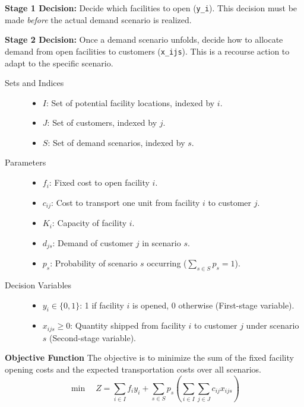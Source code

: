 \documentclass{article}
\begin{document}
\textbf{Stage 1 Decision:} Decide which facilities to open (\texttt{y\_i}). This decision must be made \textit{before} the actual demand scenario is realized.

\textbf{Stage 2 Decision:} Once a demand scenario unfolds, decide how to allocate demand from open facilities to customers (\texttt{x\_ijs}). This is a recourse action to adapt to the specific scenario.

\begin{description}
    \item[Sets and Indices]
        \begin{itemize}
            \item $I$: Set of potential facility locations, indexed by $i$.
            \item $J$: Set of customers, indexed by $j$.
            \item $S$: Set of demand scenarios, indexed by $s$.
        \end{itemize}
    \item[Parameters]
        \begin{itemize}
            \item $f_i$: Fixed cost to open facility $i$.
            \item $c_{ij}$: Cost to transport one unit from facility $i$ to customer $j$.
            \item $K_i$: Capacity of facility $i$.
            \item $d_{js}$: Demand of customer $j$ in scenario $s$.
            \item $p_s$: Probability of scenario $s$ occurring ($\sum_{s \in S} p_s = 1$).
        \end{itemize}
    \item[Decision Variables]
        \begin{itemize}
            \item $y_i \in \{0, 1\}$: 1 if facility $i$ is opened, 0 otherwise (First-stage variable).
            \item $x_{ijs} \geq 0$: Quantity shipped from facility $i$ to customer $j$ under scenario $s$ (Second-stage variable).
        \end{itemize}
\end{description}

\textbf{Objective Function}
The objective is to minimize the sum of the fixed facility opening costs and the expected transportation costs over all scenarios.
$$ \min \quad Z = \sum_{i \in I} f_i y_i + \sum_{s \in S} p_s \left( \sum_{i \in I} \sum_{j \in J} c_{ij} x_{ijs} \right) $$
\end{document}
